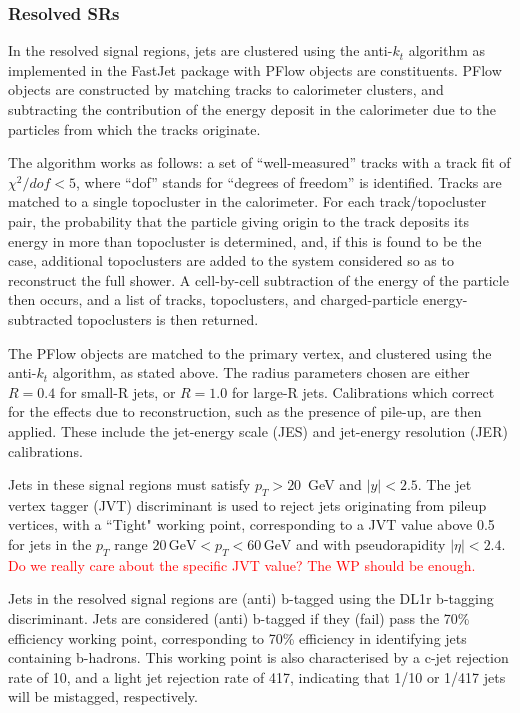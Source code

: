 \documentclass[10pt,a4paper]{book}
\newcommand{\todo}[1]{{\textcolor{red}{#1}}}
\begin{document}
\subsubsection{Resolved SRs}
In the resolved signal regions, jets are clustered using the anti-$k_t$ algorithm as implemented in the FastJet package with PFlow objects are constituents. PFlow objects are constructed by matching tracks to calorimeter clusters, and subtracting the contribution of the energy deposit in the calorimeter due to the particles from which the tracks originate. 

The algorithm works as follows: a set of ``well-measured'' tracks with  a track fit of $\chi^2/dof < 5$, where ``dof'' stands for ``degrees of freedom'' is identified. Tracks are matched to a single topocluster in the calorimeter. For each track/topocluster pair, the probability that the particle giving origin to the track deposits its energy in more than topocluster is determined, and, if this is found to be the case, additional topoclusters are added to the system considered so as to reconstruct the full shower. A cell-by-cell subtraction of the energy of the particle then occurs, and a list of tracks, topoclusters, and charged-particle energy-subtracted topoclusters is then returned. 

The PFlow objects are matched to the primary vertex, and clustered using the anti-$k_t$ algorithm, as stated above. The radius parameters chosen are either $R = 0.4$ for small-R jets, or $R = 1.0$ for large-R jets. Calibrations which correct for the effects due to reconstruction, such as the presence of pile-up, are then applied. These include the jet-energy scale (JES) and jet-energy resolution (JER) calibrations.

Jets in these signal regions must satisfy $p_T > 20$~GeV and $\vert y \vert < 2.5$. The jet vertex tagger (JVT) discriminant is used to reject jets originating from pileup vertices, with a ``Tight" working point, corresponding to a JVT value above 0.5 for jets in the $p_T$ range $20 \, \text{GeV} < p_T < 60 \, \text{GeV}$ and with pseudorapidity $\vert \eta \vert < 2.4$. \todo{Do we really care about the specific JVT value? The WP should be enough.}

Jets in the resolved signal regions are (anti) b-tagged using the DL1r  b-tagging discriminant. Jets are considered (anti) b-tagged if they (fail) pass the 70\% efficiency working point, corresponding to 70\% efficiency in identifying jets containing b-hadrons. This working point is also characterised by a c-jet rejection rate of 10, and a light jet rejection rate of 417, indicating that 1/10 or 1/417 jets will be mistagged, respectively. 
\end{document}
